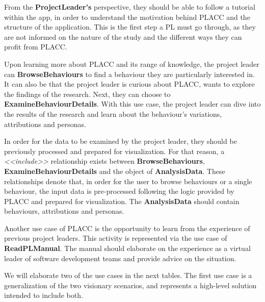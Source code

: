 From the \textbf{ProjectLeader's} perspective,  they should be able to follow a tutorial within the app, in order to understand the motivation behind PLACC and the structure of the application.  This is the first step a PL must go through, as they are not informed on the nature of the study and the different ways they can profit from PLACC.

Upon learning more about PLACC and its range of knowledge, the project leader can \textbf{BrowseBehaviours} to find a behaviour they are particularly interested in.  It can also be that the project leader is curious about PLACC, wants to explore the findings of the research.  Next,  they can choose to \textbf{ExamineBehaviourDetails}.  With this use case, the project leader can dive into the results of the research and learn about the behaviour's variations, attributions and personas.

In order for the data to be examined by the project leader, they should be previously processed and prepared for visualization. For that reason, a \textit{<<include>>} relationship exists between \textbf{BrowseBehaviours}, \textbf{ExamineBehaviourDetails} and the object of \textbf{AnalysisData}. These relationships denote that, in order for the user to browse behaviours or a single behaviour,  the input data is pre-processed following the logic provided by PLACC and prepared for visualization. The \textbf{AnalysisData} should contain behaviours, attributions and personas.

Another use case of PLACC is the opportunity to learn from the experience of previous project leaders. This activity is represented via the use case of \textbf{ReadPLManual}. The manual should elaborate on the experience as a virtual leader of software development teams and provide advice on the situation.

We will elaborate two of the use cases in the next tables. The first use case is a generalization of the two visionary scenarios, and represents a high-level solution intended to include both. 


